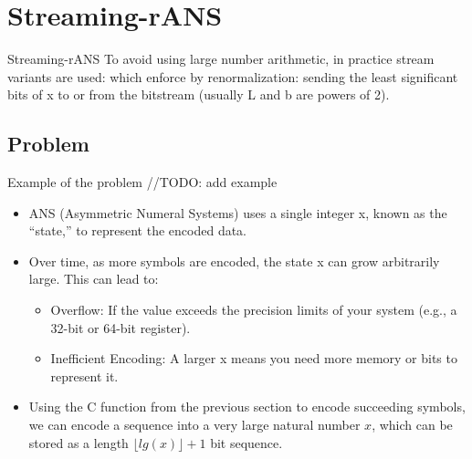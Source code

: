 \section{Streaming-rANS}
    \begin{frame}[fragile]{Streaming-rANS}
        To avoid using large number arithmetic, in practice stream variants are used: which enforce by renormalization: sending the least significant bits of x to or from the bitstream (usually L and b are powers of 2). 
    \end{frame}

\subsection{Problem}
    \begin{frame}
        Example of the problem //TODO: add example
    \end{frame}
    \begin{frame}
        \begin{itemize}
            \item ANS (Asymmetric Numeral Systems) uses a single integer x, known as the “state,” to represent the encoded data.
            \item Over time, as more symbols are encoded, the state x can grow arbitrarily large. This can lead to:
            \begin{itemize}
                \item Overflow: If the value exceeds the precision limits of your system (e.g., a 32-bit or 64-bit register).
                \item Inefficient Encoding: A larger x means you need more memory or bits to represent it.
            \end{itemize}
            \item Using the C function from the previous section to encode succeeding symbols, we can encode a sequence into a very large natural number $\mathit{x}$, which can be stored as a length $\mathit{\lfloor lg(x) \rfloor+ 1}$ bit sequence. 
        \end{itemize}
    \end{frame}

